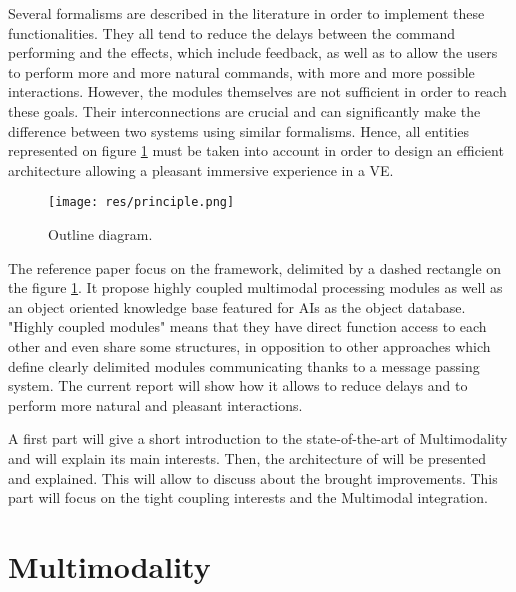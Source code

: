 \documentclass[a4paper]{article}
\begin{document}
Several formalisms are described in the literature in order to implement these functionalities. They all tend to reduce the delays between the command performing and the effects, which include feedback, as well as to allow the users to perform more and more natural commands, with more and more possible interactions. However, the modules themselves are not sufficient in order to reach these goals. Their interconnections are crucial and can significantly make the difference between two systems using similar formalisms. Hence, all entities represented on figure \ref{fig:principle} must be taken into account in order to design an efficient architecture allowing a pleasant immersive experience in a VE.

\begin{figure}
\centering
\texttt{[image: res/principle.png]}
\caption{\label{fig:principle}Outline diagram.}
\end{figure}

The reference paper \cite{latoschik} focus on the framework, delimited by a dashed rectangle on the figure \ref{fig:principle}. It propose highly coupled multimodal processing modules as well as an object oriented knowledge base featured for AIs as the object database. "Highly coupled modules" means that they have direct function access to each other and even share some structures, in opposition to other approaches which define clearly delimited modules communicating thanks to a message passing system. The current report will show how it allows to reduce delays and to perform more natural and pleasant interactions.

A first part will give a short introduction to the state-of-the-art of Multimodality and will explain its main interests. Then, the architecture of \cite{latoschik} will be presented and explained. This will allow to discuss about the brought improvements. This part will focus on the tight coupling interests and the Multimodal integration.

\section{Multimodality}
\end{document}
